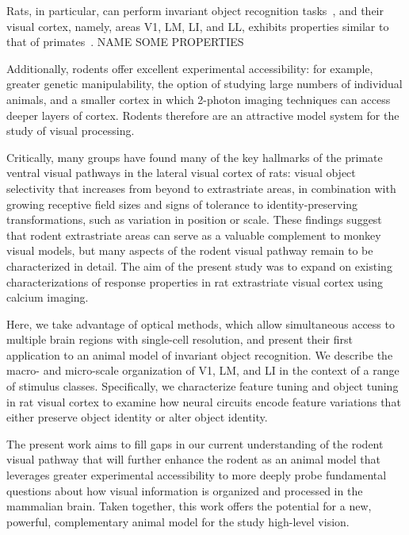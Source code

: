Rats, in particular, can perform invariant object recognition tasks~\cite{Zoccolan2009, Tafazoli2012Transformation-TolerantPriming, cite}, and their visual cortex, namely, areas V1, LM, LI, and LL, exhibits properties similar to that of primates~\cite{Tafazoli2017, Vermaercke2014, Matteucci2019b, cite}. {NAME SOME PROPERTIES}

Additionally, rodents offer excellent experimental accessibility: for example, greater genetic manipulability, the option of studying large numbers of individual animals, and a smaller cortex in which 2-photon imaging techniques can access deeper layers of cortex. Rodents therefore are an attractive model system for the study of visual processing.

Critically, many groups \cite{EVERYONE} have found many of the key hallmarks of the primate ventral visual pathways in the lateral visual cortex of rats: visual object selectivity that increases from beyond to extrastriate areas, in combination with growing receptive field sizes and signs of tolerance to identity-preserving transformations, such as variation in position or scale. These findings suggest that rodent extrastriate areas can serve as a valuable complement to monkey visual models, but many aspects of the rodent visual pathway remain to be characterized in detail. The aim of the present study was to expand on existing characterizations of response properties in rat extrastriate visual cortex using calcium imaging.


Here, we take advantage of optical methods, which allow simultaneous access to multiple brain regions with single-cell resolution, and present their first application to an animal model of invariant object recognition. We describe the macro- and micro-scale organization of V1, LM, and LI in the context of a range of stimulus classes. Specifically, we characterize feature tuning and object tuning in rat visual cortex to examine how neural circuits encode feature variations that either preserve object identity or alter object identity. 


The present work aims to fill gaps in our current understanding of the rodent visual pathway that will further enhance the rodent as an animal model that leverages greater experimental accessibility to more deeply probe fundamental questions about how visual information is organized and processed in the mammalian brain. Taken together, this work offers the potential for a new, powerful, complementary animal model for the study high-level vision.



